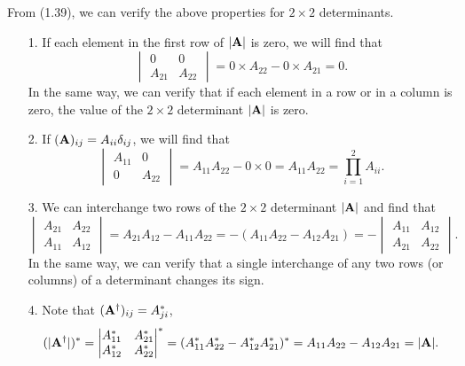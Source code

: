 \documentclass[a4paper]{book}
\newcounter{solution}[chapter]
\newcommand{\A}{{\bf A}}
\begin{document}
	\begin{solution}

	From (1.39), we can verify the above properties for $2\times2$ determinants.

	\begin{itemize}
	
	\item[1.] If each element in the first row of $|\A|$ is zero, we will find that
	\[
		\begin{vmatrix}
			0  & 0 \\ A_{21} &  A_{22} 
		\end{vmatrix} = 0 \times A_{22} - 0 \times A_{21} = 0 .
	\]
	In the same way, we can verify that if each element in a row or in a column is zero, the value of the $2 \times 2$ determinant $|\A|$ is zero.
	
	\item[2.] If $(\A)_{ij} = A_{ii} \delta_{ij}$, we will find that
	\[
		\begin{vmatrix}
			A_{11}  & 0 \\ 0 & A_{22} 
		\end{vmatrix} = A_{11} A_{22} - 0 \times 0 = A_{11} A_{22} = \prod_{ i=1 }^2 A_{ii} .
	\]
	
	\item[3.] We can interchange two rows of the $2\times2$ determinant $|\A|$ and find that
	\[
		\begin{vmatrix}
			A_{21}  & A_{22} \\ A_{11} & A_{12} 
		\end{vmatrix} = A_{21} A_{12} - A_{11} A_{22} = - ( A_{11} A_{22} - A_{12} A_{21} ) = - \begin{vmatrix}
			A_{11}  & A_{12} \\ A_{21} & A_{22} 
		\end{vmatrix} .
	\]
	In the same way, we can verify that a single interchange of any two rows (or columns) of a determinant changes its sign.
	
	\item[4.] Note that $(\A^\dagger)_{ij} = A^*_{ji}$,
	\[
		(| \A^\dagger |)^* = \begin{vmatrix}
			A^*_{11}  & A^*_{21} \\ A^*_{12} & A^*_{22} 
		\end{vmatrix}^* = ( A^*_{11} A^*_{22} - A^*_{12} A^*_{21} )^* = A_{11} A_{22} - A_{12} A_{21} = | \A | .
	\]	
	

\end{itemize}
\end{solution}
\end{document}
